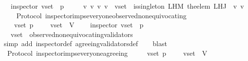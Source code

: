 \begin{isabellebody}
\ \ {\isasymlongrightarrow}\ inspector\ {\isacharparenleft}v{\isacharunderscore}set{\isacharcomma}\ {\isasymsigma}{\isacharcomma}\ p{\isacharparenright}\ \isanewline
\ \ {\isasymlongrightarrow}\ {\isacharparenleft}{\isasymforall}\ v\ v{\isacharprime}{\isachardot}\ {\isacharbraceleft}v{\isacharcomma}\ v{\isacharprime}{\isacharbraceright}\ {\isasymsubseteq}\ v{\isacharunderscore}set\ {\isasymlongrightarrow}\ is{\isacharunderscore}singleton\ {\isacharparenleft}L{\isacharunderscore}H{\isacharunderscore}M\ {\isacharparenleft}the{\isacharunderscore}elem\ {\isacharparenleft}L{\isacharunderscore}H{\isacharunderscore}J\ {\isasymsigma}\ v{\isacharparenright}{\isacharparenright}\ v{\isacharprime}{\isacharparenright}{\isacharparenright}{\isachardoublequoteclose}\isanewline
%
\isadelimproof
\ \ %
\endisadelimproof
%
\isatagproof
{}\isamarkupfalse%
%
\endisatagproof
{\isafoldproof}%
%
\isadelimproof
\isanewline
%
\endisadelimproof
\isanewline
{}\isamarkupfalse%
\ {\isacharparenleft}\ Protocol{\isacharparenright}\ inspector{\isacharunderscore}imps{\isacharunderscore}everyone{\isacharunderscore}observed{\isacharunderscore}non{\isacharunderscore}equivocating\ {\isacharcolon}\isanewline
\ \ {\isachardoublequoteopen}{\isasymforall}\ {\isasymsigma}\ v{\isacharunderscore}set\ p{\isachardot}\ {\isasymsigma}\ {\isasymin}\ {\isasymSigma}\ {\isasymand}\ v{\isacharunderscore}set\ {\isasymsubseteq}\ V\ \isanewline
\ \ {\isasymlongrightarrow}\ inspector\ {\isacharparenleft}v{\isacharunderscore}set{\isacharcomma}\ {\isasymsigma}{\isacharcomma}\ p{\isacharparenright}\ \isanewline
\ \ {\isasymlongrightarrow}\ v{\isacharunderscore}set\ {\isasymsubseteq}\ observed{\isacharunderscore}non{\isacharunderscore}equivocating{\isacharunderscore}validators\ {\isacharparenleft}{\isasymsigma}{\isacharparenright}{\isachardoublequoteclose}\isanewline
%
\isadelimproof
\ \ %
\endisadelimproof
%
\isatagproof
{}\isamarkupfalse%
\ {\isacharparenleft}simp\ add{\isacharcolon}\ inspector{\isacharunderscore}def\ agreeing{\isacharunderscore}validators{\isacharunderscore}def{\isacharparenright}\isanewline
\ \ \isamarkupfalse%
\ blast%
\endisatagproof
{\isafoldproof}%
%
\isadelimproof
\isanewline
%
\endisadelimproof
\isanewline
\isanewline
{}\isamarkupfalse%
\ {\isacharparenleft}\ Protocol{\isacharparenright}\ inspector{\isacharunderscore}imps{\isacharunderscore}everyone{\isacharunderscore}agreeing\ {\isacharcolon}\isanewline
\ \ {\isachardoublequoteopen}{\isasymforall}\ {\isasymsigma}\ v{\isacharunderscore}set\ p{\isachardot}\ {\isasymsigma}\ {\isasymin}\ {\isasymSigma}\ {\isasymand}\ v{\isacharunderscore}set\ {\isasymsubseteq}\ V\ \isanewline

\end{isabellebody}
